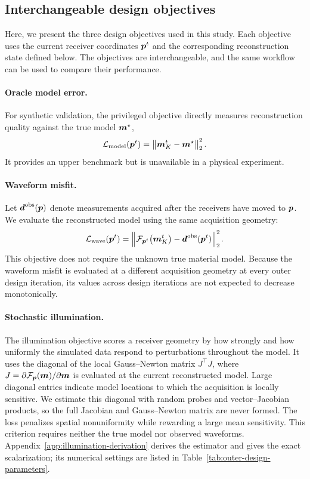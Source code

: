 \subsection{Interchangeable design objectives}

Here, we present the three design objectives used in this study. Each objective
uses the current receiver coordinates $\boldsymbol{p}^{t}$ and the corresponding
reconstruction state defined below. The objectives are interchangeable, and the
same workflow can be used to compare their performance.

\paragraph{Oracle model error.}
For synthetic validation, the privileged objective directly measures
reconstruction quality against the true model $\boldsymbol{m}^{\star}$,
\begin{equation}
  \mathcal{L}_{\mathrm{model}}(\boldsymbol{p}^{t})
  = \left\|\boldsymbol{m}_K^{t}-\boldsymbol{m}^{\star}\right\|_2^2.
\end{equation}
It provides an upper benchmark but is unavailable in a physical experiment.

\paragraph{Waveform misfit.}
Let $\boldsymbol{d}^{\mathrm{obs}}(\boldsymbol{p})$ denote measurements acquired after the
receivers have moved to $\boldsymbol{p}$. We evaluate the reconstructed model using
the same acquisition geometry:
\begin{equation}
  \mathcal{L}_{\mathrm{wave}}(\boldsymbol{p}^{t})
  = \left\|\mathcal{F}_{\boldsymbol{p}^{t}}
  \!\left(\boldsymbol{m}_K^{t}\right)
  -\boldsymbol{d}^{\mathrm{obs}}(\boldsymbol{p}^{t})\right\|_2^2.
  \label{eq:waveform}
\end{equation}
This objective does not require the unknown true material model. Because the
waveform misfit is evaluated at a different acquisition geometry at every
outer design iteration, its values across design iterations are not expected to
decrease monotonically.

\paragraph{Stochastic illumination.}
The illumination objective scores a receiver geometry by how strongly and how
uniformly the simulated data respond to perturbations throughout the model.
It uses the diagonal of the local Gauss--Newton matrix $J^\top J$, where
$J=\partial\mathcal{F}_{\boldsymbol{p}}(\boldsymbol{m})/\partial\boldsymbol{m}$ is evaluated at
the current reconstructed model. Large diagonal entries indicate model
locations to which the acquisition is locally sensitive. We estimate this
diagonal with random probes and vector--Jacobian products, so the full Jacobian
and Gauss--Newton matrix are never formed. The loss penalizes spatial
nonuniformity while rewarding a large mean sensitivity. This criterion requires neither the true model nor observed
waveforms. Appendix~\ref{app:illumination-derivation} derives the estimator and
gives the exact scalarization; its numerical settings are listed in
Table~\ref{tab:outer-design-parameters}.

